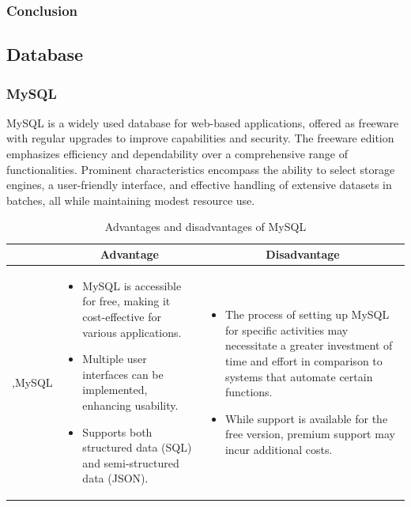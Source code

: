 \subsubsection{Conclusion}

\subsection{Database}

\subsubsection{MySQL}

MySQL is a widely used database for web-based applications, offered as freeware with regular upgrades to improve capabilities and security. The freeware edition emphasizes efficiency and dependability over a comprehensive range of functionalities. Prominent characteristics encompass the ability to select storage engines, a user-friendly interface, and effective handling of extensive datasets in batches, all while maintaining modest resource use.

\begin{table}[H]
    \centering
    \begin{tabular}{| c | p{} | p{} |}
        \hline
        \multicolumn{1}{|c|}{}
        & \multicolumn{1}{c|}{Advantage}
        & \multicolumn{1}{c|}{Disadvantage} \\ \hline
        \multirow{7}{*}{,MySQL}     
                &   \begin{itemize}[leftmargin=*,topsep=0pt,partopsep=0pt,parsep=0pt]
                        \item MySQL is accessible for free, making it cost-effective for various applications.
                        \item Multiple user interfaces can be implemented, enhancing usability.
                        \item Supports both structured data (SQL) and semi-structured data (JSON).
                    \end{itemize}
                &   \begin{itemize}[leftmargin=*,topsep=0pt,partopsep=0pt,parsep=0pt]
                        \item The process of setting up MySQL for specific activities may necessitate a greater investment of time and effort in comparison to systems that automate certain functions.
                        \item While support is available for the free version, premium support may incur additional costs.
                    \end{itemize} \\ \hline
    \end{tabular}
    \caption{Advantages and disadvantages of MySQL}
\end{table}

